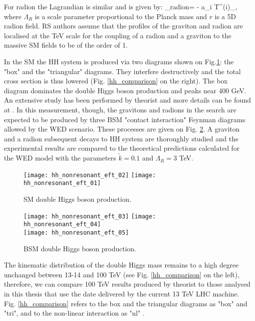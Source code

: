 For radion the Lagrandian is similar and is given by:
\beqn\label{lagr_radion}
\Lagr_{radion}=  -  \times a_i T^{\mu (i)}_{\mu},  
\eeqn
where $\Lambda_R$ is a scale parameter proportional to the Planck mass and $r$ is a 5D radion field. RS authors assume that the profiles of the graviton and radion are localised at the TeV scale for the coupling of a radion and a graviton to the massive SM fields to be of the order of 1. 




In the SM the HH system is produced via two diagrams shown on Fig.\ref{SM_HH}: the "box" and the "triangular" diagrams. They interfere destructively and the total cross section is thus lowered (Fig. \ref{hh_comparison} on the right). The box diagram dominates the double Higgs boson production and peaks near 400 GeV. An extensive study has been performed by theorist and more details can be found at \cite{Chen:2014xra}. In this measurement, though, the gravitons and radions in the search are expected to be produced by three BSM "contact interaction" Feynman diagrams allowed by the WED scenario. These processes are given on Fig. \ref{BSM_HH}.  A graviton and a radion subsequent decays to HH system are thoroughly studied and the experimental results are compared to the theoretical predictions calculated for the WED model with the parameters $\tilde{k}=0.1$ and $\Lambda_R = 3 $ TeV.  




\begin{figure}[H]
  \centering
    \texttt{[image: hh\_nonresonant\_eft\_02]}
     \texttt{[image: hh\_nonresonant\_eft\_01]}
    \caption{SM double Higgs boson production.}
    \label{SM_HH}
\end{figure}


\begin{figure}[H]
  \centering
    \texttt{[image: hh\_nonresonant\_eft\_03]}
    \texttt{[image: hh\_nonresonant\_eft\_04]}\\
     \texttt{[image: hh\_nonresonant\_eft\_05]}
    \caption{BSM double Higgs boson production.}
    \label{BSM_HH}
\end{figure}



The kinematic distribution of the double Higgs mass remains to a high degree unchanged between 13-14 and 100 TeV (see Fig. \ref{hh_comparison} on the left), therefore, we can compare 100 TeV results produced by theorist to those analysed in this thesis that use the date delivered by the current 13 TeV LHC machine. Fig. \ref{hh_comparison} refers to the box and the triangular diagrams as "box" and "tri", and to the non-linear interaction as "nl"  \cite{Contino:2012xk}. 



